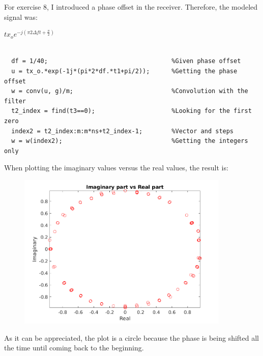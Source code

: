 \documentclass[a4paper,11pt]{article}
\begin{document}
\newpage

For exercise 8, I introduced a phase offset in the receiver. Therefore, the
modeled signal was:

\begin{center}
  $tx_o e^{-j(\pi 2\Delta f t + \displaystyle\frac{\pi}{2})}$
\end{center}

\begin{lstlisting}

  df = 1/40;                                  %Given phase offset
  u = tx_o.*exp(-1j*(pi*2*df.*t1+pi/2));      %Getting the phase offset
  w = conv(u, g)/m;                           %Convolution with the filter
  t2_index = find(t3==0);                     %Looking for the first zero
  index2 = t2_index:m:m*ns+t2_index-1;        %Vector and steps
  w = w(index2);                              %Getting the integers only

\end{lstlisting}

\bigskip

When plotting the imaginary values versus the real values, the result is:

\begin{figure}[!hp]
    \begin{center}
      \includegraphics[width=0.9\textwidth]{images/exercise8.png}
    \end{center}
\end{figure}

As it can be appreciated, the plot is a circle because the phase is being
shifted all the time until coming back to the beginning.
\end{document}
